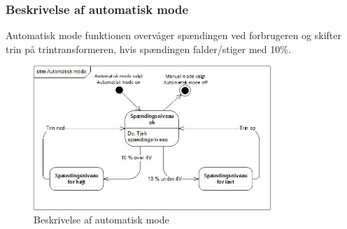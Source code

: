 \subsubsection{Beskrivelse af automatisk mode}
Automatisk mode funktionen overvåger spændingen ved forbrugeren og skifter trin på trintransformeren, hvis spændingen falder/stiger med 10\%. 
\begin{figure}[H] %
	\centering
	\includegraphics[width=0.8\textwidth]{figure/STM}
	\caption{Beskrivelse af automatisk mode}
	\label{fig:autoSTM}
\end{figure}